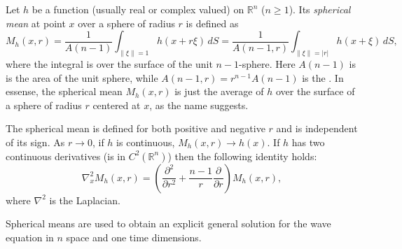 \documentclass[12pt]{article}
\def\R{\mathbb{R}}
\def\del{\partial}
\begin{document}

Let $h$ be a function (usually real or complex valued) on $\R^n$ ($n\ge1$).
Its \emph{spherical mean} at point $x$ over a sphere of radius $r$ is defined as
\begin{equation*}
  M_h(x,r) = \frac{1}{A(n-1)} \int_{\|\xi\|=1} h(x+r\xi)\, dS
    = \frac{1}{A(n-1,r)} \int_{\|\xi\|=|r|} h(x+\xi)\, dS,
\end{equation*}
where the integral is over the surface of the unit $n-1$-sphere. Here $A(n-1)$ is is the area of the unit sphere, while $A(n-1,r)=r^{n-1}A(n-1)$ is the . In essense, the spherical mean $M_h(x,r)$ is just the average of $h$ over the surface of a sphere of radius $r$ centered at $x$, as the name suggests.

The spherical mean is defined for both positive and negative $r$ and is
independent of its sign. As $r\to 0$, if $h$ is continuous, $M_h(x,r)\to
h(x)$. If $h$ has two continuous derivatives (is in $C^2(\R^n)$) then the
following identity holds:
\begin{equation*}
  \nabla^2_x M_h(x,r) = \left(\frac{\del^2}{\del r^2} + \frac{n-1}{r}
    \frac{\del}{\del r}\right) M_h(x,r),
\end{equation*}
where $\nabla^2$ is the Laplacian.

Spherical means are used to obtain an explicit general solution for the wave
equation in $n$ space and one time dimensions.
\end{document}
